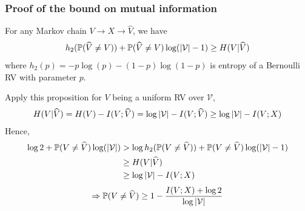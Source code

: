 \documentclass[10pt,xcolor={usenames,dvipsnames,table},aspectratio=169]{beamer}
\begin{document}
\begin{frame}
    \frametitle{Proof of the bound on mutual information}
    \begin{proposition}
        For any Markov chain $V \rightarrow X \rightarrow \widehat{V}$, we have
        \[
        h_2( \mathbb{P}(\widehat{V} \neq V)) + \mathbb{P}(\widehat{V} \neq V) \log (\left\lvert\mathcal{V}\right\rvert - 1) \geq H(V|\widehat{V})
        \] 
        where $h_2(p) = -p \log(p) - (1-p)\log(1-p)$ is entropy of a Bernoulli RV with parameter $p$.
    \end{proposition}
    Apply this proposition for $V$ being a uniform RV over  $\mathcal{V}$,
    \begin{align*}
    H(V | \widehat{V}) = H(V) - I(V;\widehat{V}) 
    = \log \left\lvert\mathcal{V}\right\rvert - I(V; \widehat{V}) 
    \geq \log \left\lvert\mathcal{V}\right\rvert - I(V; X)
    \end{align*}
    Hence,
    \begin{align*}
    \log 2 + \mathbb{P}(V \neq \widehat{V}) \log(\left\lvert\mathcal{V}\right\rvert) 
    &> \log h_2( \mathbb{P}(V \neq \widehat{V})) + \mathbb{P}(V \neq \widehat{V}) \log(\left\lvert\mathcal{V}\right\rvert-1) \\
    &\geq H(V|\widehat{V})  \\
    &\geq \log \left\lvert\mathcal{V}\right\rvert - I(V; X) \\
    \end{align*} 
    \[
    \Rightarrow
    \mathbb{P}(V \neq \widehat{V}) \geq 1- \dfrac{I(V;X) + \log2}{\log \left\lvert\mathcal{V}\right\rvert}
    \] 
    
\end{frame}
\end{document}
